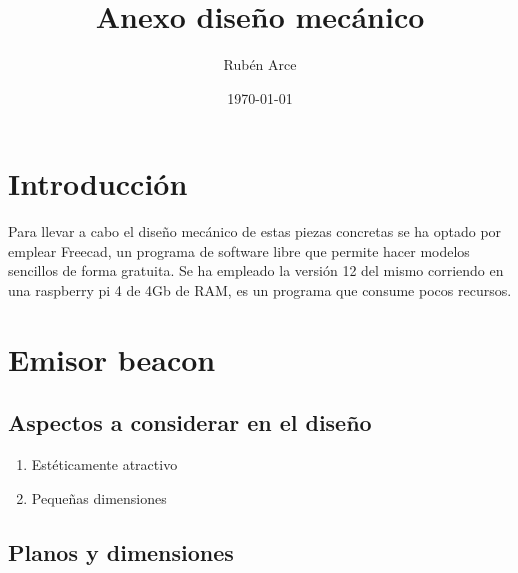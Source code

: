 \documentclass[a4paper ,12pt, onecolumn]{article}
\begin{document}
\title{Anexo diseño mecánico}

\author{Rubén Arce}
\date{\today}
\maketitle
\cleardoublepage
\tableofcontents
\cleardoublepage

\section{Introducción}
Para llevar a cabo el diseño mecánico de estas piezas concretas se ha optado por emplear Freecad, un
programa de software libre que permite hacer modelos sencillos de forma gratuita.
Se ha empleado la versión 12 del mismo corriendo en una raspberry pi 4 de 4Gb de RAM, es un programa
que consume pocos recursos.
\section{Emisor beacon}
    \subsection{Aspectos a considerar en el diseño}
        \begin{enumerate}
            \item Estéticamente atractivo
            \item Pequeñas dimensiones
        \end{enumerate}
    \subsection{Planos y dimensiones}
\end{document}

